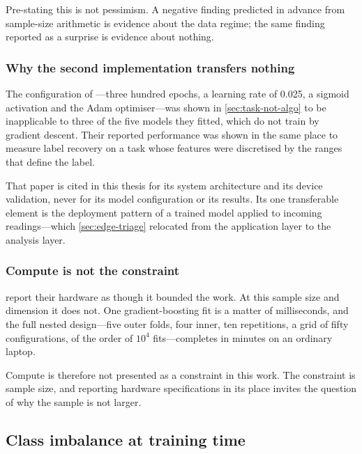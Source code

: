 \documentclass[12pt,a4paper,oneside]{report}
\begin{document}
Pre-stating this is not pessimism. A negative finding predicted in advance from sample-size arithmetic is evidence about the data regime; the same finding reported as a surprise is evidence about nothing.

\subsubsection{Why the second implementation transfers nothing}

The configuration of \textcite{efendi2025}---three hundred epochs, a learning rate of 0.025, a sigmoid activation and the Adam optimiser---was shown in \cref{sec:task-not-algo} to be inapplicable to three of the five models they fitted, which do not train by gradient descent. Their reported performance was shown in the same place to measure label recovery on a task whose features were discretised by the ranges that define the label.

That paper is cited in this thesis for its system architecture and its device validation, never for its model configuration or its results. Its one transferable element is the deployment pattern of a trained model applied to incoming readings---which \cref{sec:edge-triage} relocated from the application layer to the analysis layer.

\subsubsection{Compute is not the constraint}

\Textcite{efendi2025} report their hardware as though it bounded the work. At this sample size and dimension it does not. One gradient-boosting fit is a matter of milliseconds, and the full nested design---five outer folds, four inner, ten repetitions, a grid of fifty configurations, of the order of $10^4$ fits---completes in minutes on an ordinary laptop.

Compute is therefore not presented as a constraint in this work. The constraint is sample size, and reporting hardware specifications in its place invites the question of why the sample is not larger.

\subsection{Class imbalance at training time}\label{sec:imbalance-training}
\end{document}
